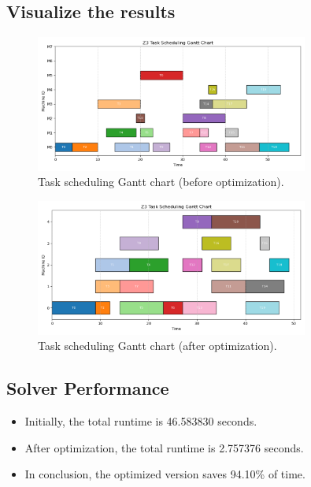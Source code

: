 \documentclass{article}
\begin{document}
\subsection{Visualize the results}
\begin{figure}[h] 
    \centering
    \includegraphics[width=0.8\textwidth]{7a.png} 
    \caption{Task scheduling Gantt chart (before optimization).} 
    \label{fig:gantt} 
\end{figure}
\begin{figure}[h] 
    \centering
    \includegraphics[width=0.8\textwidth]{7a_opt.png} 
    \caption{Task scheduling Gantt chart (after optimization).} 
    \label{fig:gantt} 
\end{figure}

\subsection{Solver Performance}
\begin{itemize}
    \item Initially, the total runtime is 46.583830 seconds.
    \item After optimization, the total runtime is 2.757376 seconds.
    \item In conclusion, the optimized version saves 94.10\% of time.
\end{itemize}
\end{document}
